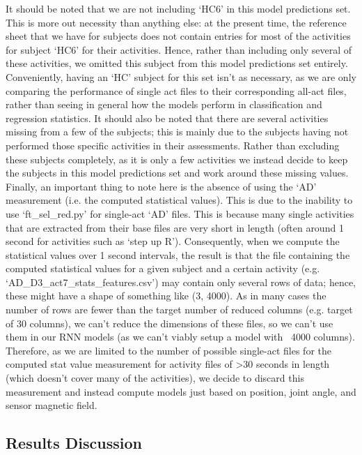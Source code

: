 \documentclass[12pt,twoside]{report}
\begin{document}
\quad It should be noted that we are not including ‘HC6’ in this model predictions set. This is more out necessity than anything else: at the present time, the reference sheet that we have for subjects does not contain entries for most of the activities for subject ‘HC6’ for their activities. Hence, rather than including only several of these activities, we omitted this subject from this model predictions set entirely. Conveniently, having an ‘HC’ subject for this set isn’t as necessary, as we are only comparing the performance of single act files to their corresponding all-act files, rather than seeing in general how the models perform in classification and regression statistics. It should also be noted that there are several activities missing from a few of the subjects; this is mainly due to the subjects having not performed those specific activities in their assessments. Rather than excluding these subjects completely, as it is only a few activities we instead decide to keep the subjects in this model predictions set and work around these missing values.\\

\quad Finally, an important thing to note here is the absence of using the ‘AD’ measurement (i.e. the computed statistical values). This is due to the inability to use ‘ft\_sel\_red.py’ for single-act ‘AD’ files. This is because many single activities that are extracted from their base files are very short in length (often around 1 second for activities such as ‘step up R’). Consequently, when we compute the statistical values over 1 second intervals, the result is that the file containing the computed statistical values for a given subject and a certain activity (e.g. ‘AD\_D3\_act7\_stats\_features.csv’) may contain only several rows of data; hence, these might have a shape of something like (3, 4000). As in many cases the number of rows are fewer than the target number of reduced columns (e.g. target of 30 columns), we can’t reduce the dimensions of these files, so we can’t use them in our RNN models (as we can’t viably setup a model with ~4000 columns). Therefore, as we are limited to the number of possible single-act files for the computed stat value measurement for activity files of >30 seconds in length (which doesn’t cover many of the activities), we decide to discard this measurement and instead compute models just based on position, joint angle, and sensor magnetic field.


\subsection{Results Discussion}
\end{document}
